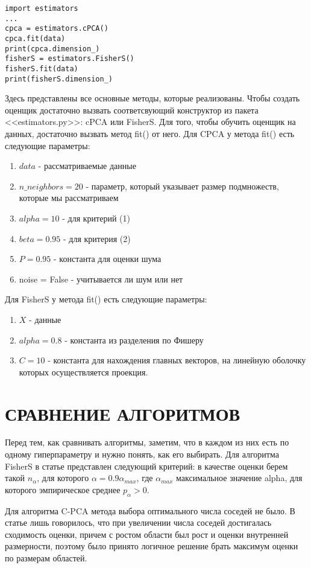 \documentclass[english, russian]{sobraep}
\begin{document}
\begin{lstlisting}
import estimators
...
cpca = estimators.cPCA()
cpca.fit(data)
print(cpca.dimension_)
fisherS = estimators.FisherS()
fisherS.fit(data)
print(fisherS.dimension_)
\end{lstlisting}

Здесь представлены все основные методы, которые реализованы. Чтобы создать оценщик достаточно вызвать соответсвующий конструктор из пакета <<estimators.py>>: cPCA или FisherS. Для того, чтобы обучить оценщик на данных, достаточно вызвать метод fit() от него. 
Для CPCA у метода fit() есть следующие параметры: 
\begin{enumerate}
    \item $data$ - рассматриваемые данные
    \item $n\_neighbors = 20$ - параметр, который указывает размер подмножеств, которые мы рассматриваем
    \item $alpha = 10$ - для критерий (1)
    \item $beta = 0.95$ - для критерия (2)
    \item $P = 0.95$ - константа для оценки шума 
    \item noise = False - учитывается ли шум или нет
\end{enumerate}

Для FisherS у метода fit() есть следующие параметры: 
\begin{enumerate}
    \item $X$ - данные
    \item $alpha = 0.8$ - константа из разделения по Фишеру
    \item $C = 10$ - константа для нахождения главных векторов, на линейную оболочку которых осуществляется проекция. 
\end{enumerate}

\section{СРАВНЕНИЕ АЛГОРИТМОВ}
Перед тем, как сравнивать алгоритмы, заметим, что в каждом из них есть по одному гиперпараметру и нужно понять, как его выбирать. Для алгоритма FisherS в статье представлен следующий критерий: в качестве оценки берем такой $n_\alpha$, для которого $\alpha = 0.9\alpha_{max}$, где $\alpha_{max}$ максимальное значение alpha, для которого эмпирическое среднее $p_\alpha > 0$.

Для алгоритма C-PCA метода выбора оптимального числа соседей не было. В статье лишь говорилось, что при увеличении числа соседей достигалась сходимость оценки, причем с ростом области был рост и оценки внутренней размерности, поэтому было принято логичное решение брать максимум оценки по размерам областей.
\end{document}
